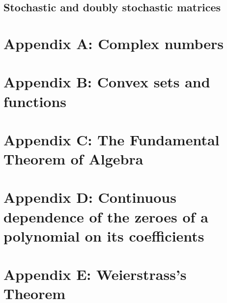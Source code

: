 \documentclass[a4paper]{article}
\newcommand{\todobox}{\textcolor{red}{\fbox{\phantom{--}}}}
\begin{document}
\subsection{Stochastic and doubly stochastic matrices}
\todobox
\newpage
\section{Appendix A: Complex numbers}

\newpage
\section{Appendix B: Convex sets and functions}

\newpage
\section{Appendix C: The Fundamental Theorem of Algebra}

\newpage
\section{Appendix D: Continuous dependence of the zeroes of a polynomial on its coefficients}

\newpage
\section{Appendix E: Weierstrass's Theorem}
\end{document}
